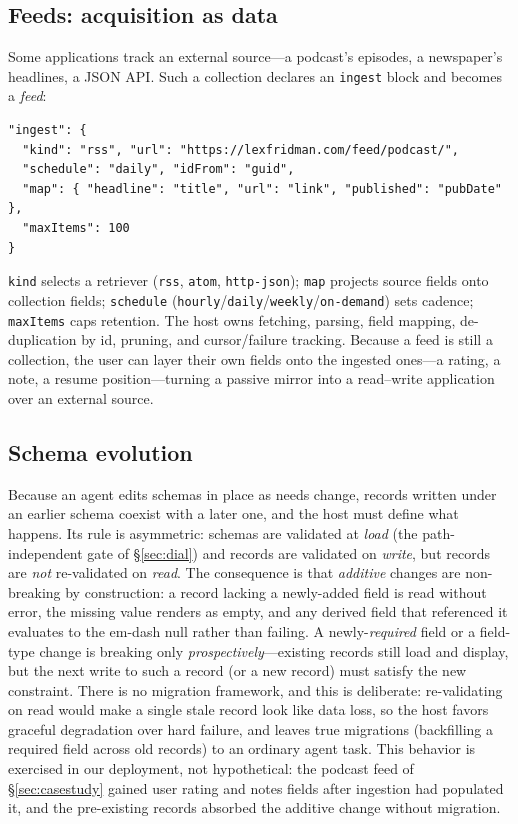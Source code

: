 \documentclass[11pt]{article}
\newcommand{\code}[1]{\texttt{\small #1}}
\begin{document}
\subsection{Feeds: acquisition as data}
Some applications track an external source---a podcast's episodes, a newspaper's
headlines, a JSON API. Such a collection declares an \code{ingest} block and
becomes a \emph{feed}:
\begin{lstlisting}
"ingest": {
  "kind": "rss", "url": "https://lexfridman.com/feed/podcast/",
  "schedule": "daily", "idFrom": "guid",
  "map": { "headline": "title", "url": "link", "published": "pubDate" },
  "maxItems": 100
}
\end{lstlisting}
\code{kind} selects a retriever (\code{rss}, \code{atom}, \code{http-json});
\code{map} projects source fields onto collection fields; \code{schedule}
(\code{hourly}/\code{daily}/\code{weekly}/\code{on-demand}) sets cadence;
\code{maxItems} caps retention. The host owns fetching, parsing, field mapping,
de-duplication by id, pruning, and cursor/failure tracking. Because a feed is
still a collection, the user can layer their own fields onto the ingested
ones---a rating, a note, a resume position---turning a passive mirror into a
read--write application over an external source.

\subsection{Schema evolution}
\label{sec:evolution}
Because an agent edits schemas in place as needs change, records written under an
earlier schema coexist with a later one, and the host must define what happens.
Its rule is asymmetric: schemas are validated at \emph{load} (the path-independent
gate of \S\ref{sec:dial}) and records are validated on \emph{write}, but records
are \emph{not} re-validated on \emph{read}. The consequence is that
\emph{additive} changes are non-breaking by construction: a record lacking a
newly-added field is read without error, the missing value renders as empty, and
any derived field that referenced it evaluates to the em-dash null rather than
failing. A newly-\emph{required} field or a field-type change is breaking only
\emph{prospectively}---existing records still load and display, but the next write
to such a record (or a new record) must satisfy the new constraint. There is no
migration framework, and this is deliberate: re-validating on read would make a
single stale record look like data loss, so the host favors graceful degradation
over hard failure, and leaves true migrations (backfilling a required field across
old records) to an ordinary agent task. This behavior is exercised in our
deployment, not hypothetical: the podcast feed of \S\ref{sec:casestudy} gained
user rating and notes fields after ingestion had populated it, and the pre-existing
records absorbed the additive change without migration.
\end{document}

